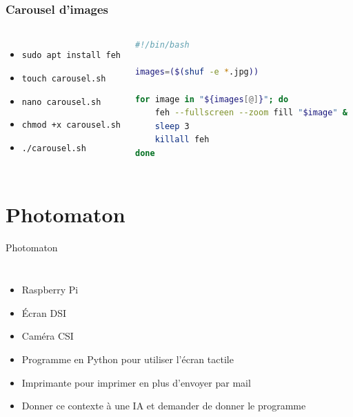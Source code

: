 \documentclass[aspectratio=169,xcolor=dvipsnames]{beamer}
\begin{document}
\begin{frame}[fragile]
\frametitle{Carousel d'images}
    \begin{columns}[c] %

        \begin{itemize}
            \item \texttt{sudo apt install feh}
            \item \texttt{touch carousel.sh}
            \item \texttt{nano carousel.sh}
            \item \texttt{chmod +x carousel.sh}
            \item \texttt{./carousel.sh}
        \end{itemize}

        \begin{lstlisting}[language=Bash, caption=carousel.sh]
#!/bin/bash

images=($(shuf -e *.jpg))

for image in "${images[@]}"; do
    feh --fullscreen --zoom fill "$image" &
    sleep 3
    killall feh
done
        \end{lstlisting}

    \end{columns}
\end{frame}

\section{Photomaton}

\begin{frame}{Photomaton}
    \begin{columns}[c] %

        \begin{itemize}
            \item Raspberry Pi
            \item Écran DSI
            \item Caméra CSI
            \item Programme en Python pour utiliser l'écran tactile
            \item Imprimante pour imprimer en plus d'envoyer par mail
            \item Donner ce contexte à une IA et demander de donner le programme
        \end{itemize}

    \end{columns}
\end{frame}
\end{document}
